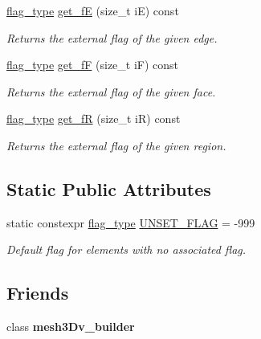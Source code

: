 \begin{DoxyCompactItemize}
\hyperlink{classStemMesh3D_1_1mesh__3Dv_a9544cba555b60f17f04fcd1689314338}{flag\+\_\+type} \hyperlink{classStemMesh3D_1_1mesh__3Dv_af9f9b082c0849c0d4b2f52f20a5f491a}{get\+\_\+fE} (size\+\_\+t iE) const
\begin{DoxyCompactList}\small\item\em Returns the external flag of the given edge. \end{DoxyCompactList}\item 
\hyperlink{classStemMesh3D_1_1mesh__3Dv_a9544cba555b60f17f04fcd1689314338}{flag\+\_\+type} \hyperlink{classStemMesh3D_1_1mesh__3Dv_a18b520ee0f337abad9f7f1c07ddb423d}{get\+\_\+fF} (size\+\_\+t iF) const
\begin{DoxyCompactList}\small\item\em Returns the external flag of the given face. \end{DoxyCompactList}\item 
\hyperlink{classStemMesh3D_1_1mesh__3Dv_a9544cba555b60f17f04fcd1689314338}{flag\+\_\+type} \hyperlink{classStemMesh3D_1_1mesh__3Dv_a3274375ccd0ac08edeadd853fef5f800}{get\+\_\+fR} (size\+\_\+t iR) const
\begin{DoxyCompactList}\small\item\em Returns the external flag of the given region. \end{DoxyCompactList}\end{DoxyCompactItemize}
\subsection*{Static Public Attributes}
\begin{DoxyCompactItemize}
\item 
\mbox{\label{classStemMesh3D_1_1mesh__3Dv_a6d5a6a1b8c9f941d2ff32b20ee718ed7}} 
static constexpr \hyperlink{classStemMesh3D_1_1mesh__3Dv_a9544cba555b60f17f04fcd1689314338}{flag\+\_\+type} \hyperlink{classStemMesh3D_1_1mesh__3Dv_a6d5a6a1b8c9f941d2ff32b20ee718ed7}{U\+N\+S\+E\+T\+\_\+\+F\+L\+AG} = -\/999
\begin{DoxyCompactList}\small\item\em Default flag for elements with no associated flag. \end{DoxyCompactList}\end{DoxyCompactItemize}
\subsection*{Friends}
\begin{DoxyCompactItemize}
\item 
\mbox{\label{classStemMesh3D_1_1mesh__3Dv_aafdd4f7e6c95e7b1e521233532cfe570}} 
class {\bfseries mesh3\+Dv\+\_\+builder}
\end{DoxyCompactItemize}



